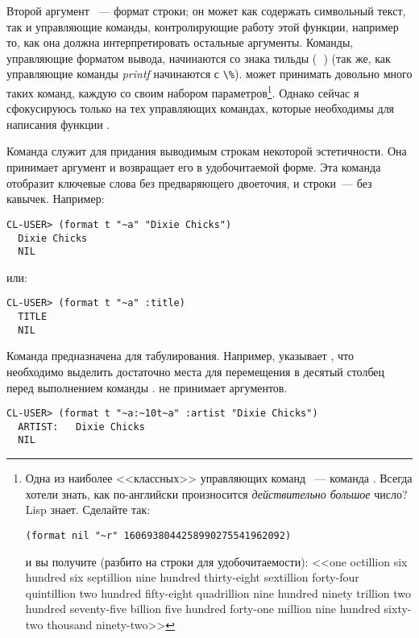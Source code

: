 Второй аргумент ~--- формат строки; он может как содержать символьный текст,
так и управляющие команды, контролирующие работу этой функции, например то, как она должна
интерпретировать остальные аргументы. Команды, управляющие форматом вывода, начинаются со
знака тильды (\textbf{~}) (так же, как управляющие команды \textit{printf} начинаются с
\lstinline{\%}).  может принимать довольно много таких команд, каждую со
своим набором параметров\footnote{Одна из наиболее <<классных>> управляющих команд
  ~--- команда . Всегда хотели знать, как по-английски произносится
  \textit{действительно большое} число? Lisp знает. Сделайте так:

\begin{lstlisting}
(format nil "~r" 1606938044258990275541962092)
\end{lstlisting}

и вы получите (разбито на строки для удобочитаемости): <<one octillion six hundred six
septillion nine hundred thirty-eight sextillion forty-four quintillion two hundred
fifty-eight quadrillion nine hundred ninety trillion two hundred seventy-five billion five
hundred forty-one million nine hundred sixty-two thousand ninety-two>>}. Однако сейчас я
сфокусируюсь только на тех управляющих командах, которые необходимы для написания функции
.

Команда  служит для придания выводимым строкам некоторой эстетичности. Она
принимает аргумент и возвращает его в удобочитаемой форме. Эта команда отобразит ключевые
слова без предваряющего двоеточия, и строки~--- без кавычек. Например:

\begin{lstlisting}[style=lisprepl]
  CL-USER> (format t "~a" "Dixie Chicks")
  Dixie Chicks
  NIL
\end{lstlisting}

\noindent{}или:

\begin{lstlisting}[style=lisprepl]
  CL-USER> (format t "~a" :title)
  TITLE
  NIL
\end{lstlisting}

Команда  предназначена для табулирования. Например,  указывает
, что необходимо выделить достаточно места для перемещения в десятый столбец
перед выполнением команды .  не принимает аргументов.

\begin{lstlisting}[style=lisprepl]
  CL-USER> (format t "~a:~10t~a" :artist "Dixie Chicks")
  ARTIST:   Dixie Chicks
  NIL
\end{lstlisting}

